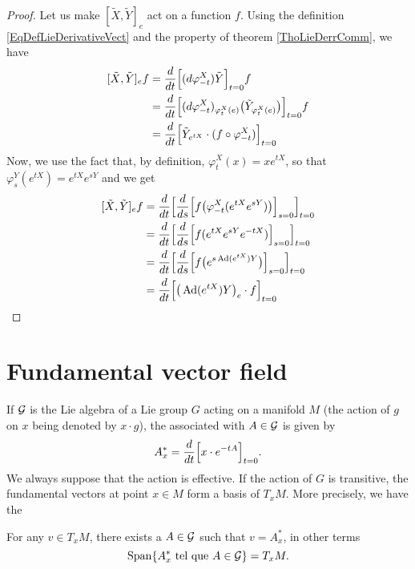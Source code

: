 \begin{proof}
	Let us make $[\tilde X,\tilde Y]_e$ act on a function $f$. Using the definition \eqref{EqDefLieDerivativeVect} and the property of theorem \ref{ThoLieDerrComm}, we have
	\begin{equation}
		\begin{aligned}[]
			[\tilde X,\tilde Y]_ef&=\Dsdd{ (d\varphi_{-t}^X)\tilde Y }{t}{0}f\\
			&=\Dsdd{ (d\varphi_{-t}^X)_{\varphi_t^X(e)}\big( \tilde Y_{\varphi_t^X(e)} \big) }{t}{0}f\\
			&=\Dsdd{ \tilde Y_{ e^{tX}}\cdot(f\circ\varphi_{-t}^X) }{t}{0}
		\end{aligned}
	\end{equation}
	Now, we use the fact that, by definition, $\varphi_t^X(x)=x e^{tX}$, so that $\varphi_s^Y( e^{tX})= e^{tX} e^{sY}$ and we get
	\begin{equation}
		\begin{aligned}[]
			[\tilde X,\tilde Y]_ef&=\Dsdd{ \Dsdd{ f\big( \varphi_{-t}^X( e^{tX} e^{sY}) \big) }{s}{0} }{t}{0}\\
			&=\Dsdd { \Dsdd{ f( e^{tX} e^{sY} e^{-tX}) }{s}{0} } {t}{0}\\
			&=\Dsdd{ \Dsdd{ f\big(  e^{s\Ad( e^{tX})Y} \big) }{s}{0} }{t}{0}\\
			&=\Dsdd{ \big( \Ad( e^{tX})Y \big)_e\cdot f }{t}{0}
		\end{aligned}
	\end{equation}
	
\end{proof}


\section{Fundamental vector field}\label{sec:fond_vec}

If $\mathcal{G}$ is the Lie algebra of a Lie group $G$ acting on a manifold $M$ (the action of $g$ on $x$ being denoted by $x\cdot g$), the  associated with $A\in\mathcal{G}$ is given by
\begin{equation}			\label{EqDefChmpFond}
   A^*_x=\frac{d}{dt}\Big[ x\cdot e^{-tA} \Big]_{t=0}.
\end{equation}
We always suppose that the action is effective. If the action of $G$ is transitive, the fundamental vectors at point $x\in M$ form a basis of $T_xM$. More precisely, we have the

\begin{lemma}
For any $v\in T_xM$, there exists a $A\in\mathcal{G}$ such that $v=A^*_x$, in other terms
\[ 
  \operatorname{Span}\{ A^*_{x}\text{ tel que } A\in\mathcal{G} \}=T_{x}M.
\]
\label{LemFundSpansTan}
\end{lemma}


